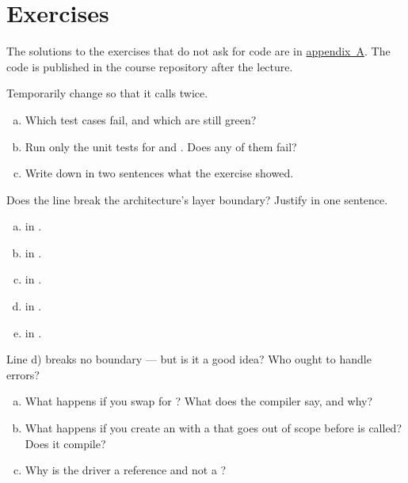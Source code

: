 \section*{Exercises}

The solutions to the exercises that do not ask for code are in
\hyperref[ch:losningar]{appendix~A}. The code is published in the course repository after the
lecture.

\label{ex:7:1}
Temporarily change  so that it calls  twice.
\begin{enumerate}[a)]
  \item Which test cases fail, and which are still green?
  \item Run only the unit tests for  and . Does any of them fail?
  \item Write down in two sentences what the exercise showed.
\end{enumerate}

\label{ex:7:2}
Does the line break the architecture's layer boundary? Justify in one sentence.
\begin{enumerate}[a)]
  \item {} in .
  \item {} in .
  \item {} in .
  \item {} in .
  \item {} in .
\end{enumerate}
Line d) breaks no boundary --- but is it a good idea? Who ought to handle errors?

\label{ex:7:3}
\begin{enumerate}[a)]
  \item What happens if you swap  for
    ? What does the compiler say, and why?
  \item What happens if you create an  with a  that goes out of scope
    before  is called? Does it compile?
  \item Why is the driver a reference and not a ?
\end{enumerate}

